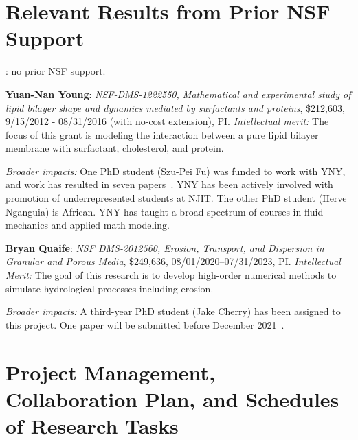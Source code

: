 \section{Relevant Results from Prior NSF Support}
: no prior NSF support.

\noindent
{\bf Yuan-Nan Young}: {\em NSF-DMS-1222550, Mathematical and
experimental study of lipid bilayer shape and dynamics mediated by
surfactants and proteins}, \$212,603, 9/15/2012 - 08/31/2016 (with
no-cost extension), PI. {\em Intellectual merit:} The focus of this
grant is modeling the interaction between a pure lipid bilayer membrane
with surfactant, cholesterol, and protein.


\noindent
{\it Broader impacts:} 
One PhD student (Szu-Pei Fu) was funded to work with YNY, and work has
resulted in seven papers~\cite{Nganguia2013_PoF, Nganguia2013_PRE,
Young2014_JFM, Young2015_PoF, Nganguia2015_CiCP,
Pak2015_PNAS,fu2015pre}. YNY has been actively involved with promotion
of underrepresented students at NJIT. The other PhD student (Herve
Nganguia) is African. YNY has taught a broad spectrum of courses in
fluid mechanics and applied math modeling.

\noindent
{\bf Bryan Quaife}: {\em NSF DMS-2012560, Erosion, Transport, and
Dispersion in Granular and Porous Media}, \$249,636,
08/01/2020--07/31/2023, PI. {\em Intellectual Merit:} The goal of this
research is to develop high-order numerical methods to
simulate hydrological processes including erosion.

\noindent
{\it Broader impacts:} 
A third-year PhD student (Jake Cherry) has been assigned to this
project. One paper will be submitted before December
2021~\cite{lin-her-qua-che2021}.

\section{Project Management, Collaboration Plan, and Schedules of
Research Tasks}
\setlength{\parindent}{0pt}

